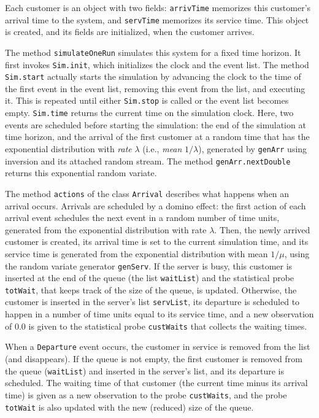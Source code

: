Each customer is an object with two fields: \texttt{arrivTime}
memorizes this customer's arrival time to the system, and
\texttt{servTime} memorizes its service time.
This object is created, and its fields are initialized,
when the customer arrives.

The method \texttt{simulateOneRun} simulates this system for a fixed
time horizon.  It first invokes \texttt{Sim.init},
which initializes the clock and the event list.
The method \texttt{Sim.start} actually starts the simulation
by advancing the clock to the time of
the first event in the event list, removing this event
from the list, and executing it.  This is repeated until either
\texttt{Sim.stop} is called or the event list becomes empty.
\texttt{Sim.time} returns the current time on the simulation clock.
Here, two events are scheduled before starting the simulation:
the end of the simulation at time horizon, and the
arrival of the first customer at a random time that has the exponential
distribution with \emph{rate} $\lambda$ (i.e., \emph{mean} $1/\lambda$),
generated by \texttt{genArr} using inversion and its attached random stream.
The method \texttt{genArr.nextDouble} returns this exponential random variate.

The method \texttt{actions} of the class \texttt{Arrival} describes what happens
when an arrival occurs.
Arrivals are scheduled by a domino effect:
the first action of each arrival event schedules the next event in
a random number of time units, generated from the exponential distribution
with rate $\lambda$.
Then, the newly arrived customer is created,
its arrival time is set to the current simulation time,
and its service time is generated from the exponential distribution
with mean $1/\mu$, using the random variate generator \texttt{genServ}.
If the server is busy, this customer is inserted at the end of the
queue (the list \texttt{waitList}) and the statistical probe
\texttt{totWait}, that keeps track of the size of the queue, is updated.
Otherwise, the customer is inserted in the server's list \texttt{servList},
its departure is scheduled to happen in a number of time units
equal to its service time, and a new observation of 0.0 is given to the
statistical probe \texttt{custWaits} that collects the waiting times.

When a \texttt{Departure} event occurs, the customer in service is
removed from the list (and disappears).
If the queue is not empty, the first customer is removed from
the queue (\texttt{waitList}) and inserted in the server's list,
and its departure is scheduled.
The waiting time of that customer (the current time minus its
arrival time) is given as a new observation to the probe
\texttt{custWaits}, and the probe \texttt{totWait} is also updated
with the new (reduced) size of the queue.

